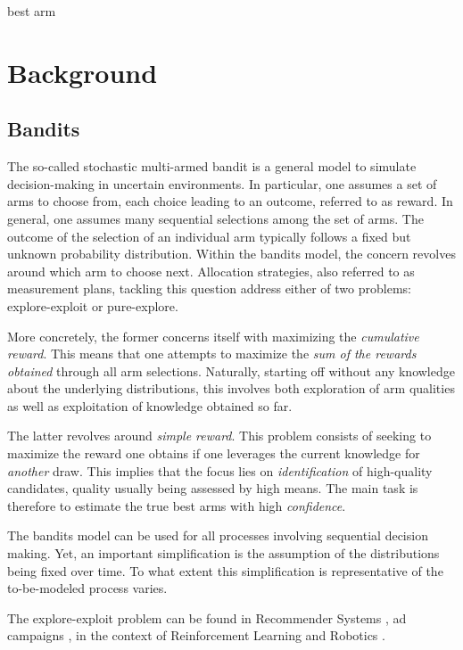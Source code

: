best arm\chapter{Background}\label{chapter:background}

\section{Bandits}
The so-called stochastic multi-armed bandit is a general model to simulate
decision-making in uncertain environments. In particular, one assumes a set of
arms to choose from, each choice leading to an outcome, referred
to as reward. In general, one assumes many sequential selections among the set
of arms. The outcome of the selection of an individual arm typically follows a
fixed but unknown probability distribution.
Within the bandits model, the concern revolves around which arm to choose next.
Allocation strategies, also referred to as measurement plans, tackling this
question address either of two problems: explore-exploit or pure-explore.

More concretely, the former concerns itself with maximizing the \emph{cumulative
reward}. This means that one attempts to maximize the \emph{sum of the rewards
obtained} through all arm selections. Naturally, starting off without any
knowledge about the underlying distributions, this involves both exploration of
arm qualities as well as exploitation of knowledge obtained so far.

The latter revolves around \emph{simple reward}. This problem consists of
seeking to maximize the reward one obtains if one leverages the current
knowledge for \emph{another} draw. This implies that the focus lies on
\emph{identification} of high-quality candidates, quality usually being assessed
by high means. The main task is therefore to estimate the true best arms
with high \emph{confidence}.

The bandits model can be used for all processes involving sequential decision
making. Yet, an important simplification is the assumption of the distributions
being fixed over time. To what extent this simplification is representative of
the to-be-modeled process varies.

The explore-exploit problem can be found in Recommender Systems \cite{McInerney:2018:EEE:3240323.3240354}, ad campaigns \cite{5360225},
in the context of Reinforcement Learning
\cite{DBLP:journals/corr/abs-1811-12560} \cite{Szepesvari:2010:ARL:1855083} and
Robotics \cite{Baldassano}.

